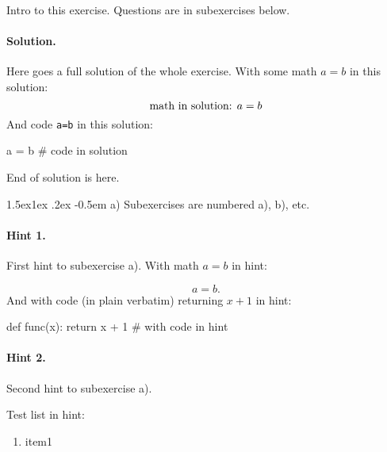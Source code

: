 \documentclass[%
oneside,                 %
final,                   %
10pt]{article}
\makeatletter
\newenvironment{doconceexercise}{}{}
\newcounter{doconceexercisecounter}
\newcommand\subex{\@startsection{paragraph}{4}{\z@}%
                  {1.5ex\@plus1ex \@minus.2ex}%
                  {-0.5em}%
                  {\normalfont\normalsize\bfseries}}
\theoremstyle{definition}
\makeatother
\begin{document}
\begin{enumerate}
\begin{doconceexercise}
\end{doconceexercise}

\begin{doconceexercise}

                             
\label{exer:dist}

Intro to this exercise. Questions are in subexercises below.

\paragraph{Solution.}
Here goes a full solution of the whole exercise.
With some math $a=b$ in this solution:
\[ \hbox{math in solution: } a = b \]
And code \texttt{a=b} in this solution:


\bccq
a = b  # code in solution

\eccq

End of solution is here.


\subex{a)}
Subexercises are numbered a), b), etc.


\paragraph{Hint 1.}
First hint to subexercise a).
With math $a=b$ in hint:

\[ a=b. \]
And with code (in plain verbatim) returning $x+1$ in hint:




\bccq
def func(x):
    return x + 1  # with code in hint

\eccq




\paragraph{Hint 2.}
Second hint to subexercise a).

Test list in hint:

\begin{enumerate}
\item item1


\end{enumerate}
\end{doconceexercise}
\end{enumerate}
\end{document}
